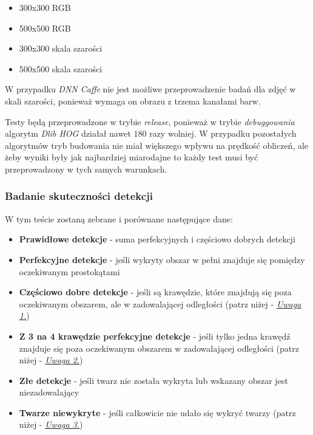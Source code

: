 \begin{itemize}
    \item 300x300 RGB
    \item 500x500 RGB
    \item 300x300 skala szarości
    \item 500x500 skala szarości
\end{itemize}

W przypadku \textit{DNN Caffe} nie jest możliwe przeprowadzenie badań dla zdjęć w skali szarości, ponieważ wymaga on obrazu z trzema kanałami barw.
\par
Testy będą przeprowadzone w trybie \textit{release}, ponieważ w trybie \textit{debuggowania} algorytm \textit{Dlib HOG} działał nawet $180$ razy wolniej. W przypadku pozostałych algorytmów tryb budowania nie miał większego wpływu na prędkość obliczeń, ale żeby wyniki były jak najbardziej miarodajne to każdy test musi być przeprowadzony w tych samych warunkach.







\subsubsection{Badanie skuteczności detekcji} \label{section:skutecznosc_detekcji_twarzy}

W tym teście zostaną zebrane i porównane następujące dane:
\begin{itemize}
    \item \textbf{Prawidłowe detekcje} - suma perfekcyjnych i częściowo dobrych detekcji
    \item \textbf{Perfekcyjne detekcje} - jeśli wykryty obszar w pełni znajduje się pomiędzy oczekiwanym prostokątami
    \item \textbf{Częściowo dobre detekcje} - jeśli są krawędzie, które znajdują się poza oczekiwanym obszarem, ale w zadowalającej odległości (patrz niżej - \hyperref[{uwaga:czesciowo_dobry}]{\textit{Uwaga 1.}})
    \item \textbf{Z 3 na 4 krawędzie perfekcyjne detekcje} - jeśli tylko jedna krawędź znajduje się poza oczekiwanym obszarem w zadowalającej odległości (patrz niżej - \hyperref[{uwaga:3_4_perfekcyjny}]{\textit{Uwaga 2.}})
    \item \textbf{Złe detekcje} - jeśli twarz nie została wykryta lub wskazany obszar jest niezadowalający
    \item \textbf{Twarze niewykryte} - jeśli całkowicie nie udało się wykryć twarzy (patrz niżej - \hyperref[{uwaga:dodatkowy_zle}]{\textit{Uwaga 3.}})
\end{itemize}

